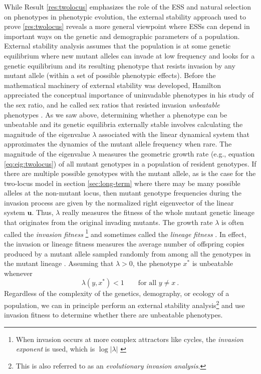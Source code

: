 \documentclass[11pt]{article}
\newcommand{\ess}[1]{#1^*}
\renewcommand{\vec}[1]{\symbf{#1}}
\newcommand{\eig}{\lambda}
\begin{document}
While Result \ref{res:twolocus} emphasizes the role of the ESS and natural selection on phenotypes in phenotypic evolution, the external stability approach used to prove \ref{res:twolocus} reveals a more general viewpoint where ESSs can depend in important ways on the genetic and demographic parameters of a population. External stability analysis assumes that the population is at some genetic equilibrium where new mutant alleles can invade at low frequency and looks for a genetic equilibrium and its resulting phenotype that resists invasion by any mutant allele (within a set of possible phenotypic effects). Before the mathematical machinery of external stability was developed, Hamilton appreciated the conceptual importance of uninvadable phenotypes in his study of the sex ratio, and he called sex ratios that resisted invasion \textit{unbeatable} phenotypes \cite{Hamilton:1967}. As we saw above, determining whether a phenotype can be unbeatable and its genetic equilibria externally stable involves calculating the magnitude of the eigenvalue $\eig$ associated with the linear dynamical system that approximates the dynamics of the mutant allele frequency when rare. The magnitude of the eigenvalue $\eig$ measures the geometric growth rate (e.g., equation \eqref{eq:eig:twolocus}) of all mutant genotypes in a population of resident genotypes. If there are multiple possible genotypes with the mutant allele, as is the case for the two-locus model in section \ref{sec:long-term} where there may be many possible alleles at the non-mutant locus, then mutant genotype frequencies during the invasion process are given by the normalized right eigenvector of the linear system $\vec{u}$. Thus, $\eig$ really measures the fitness of the whole mutant genetic lineage that originates from the original invading mutants. The growth rate $\eig$ is often called the \textit{invasion fitness} \cite{Metz:Nisbet:1992,Heino:Metz:1998}\footnote{When invasion occurs at more complex attractors like cycles, the \textit{invasion exponent} is used, which is $\log |\eig|$ \cite{Rand:Wilson:1994}} and sometimes called the \textit{lineage fitness} \cite{Lehmann:Alger:2015,Akcay:VanCleve:2016,Lehmann:Mullon:2016,Lehmann:Rousset:2020}. In effect, the invasion or lineage fitness measures the average number of offspring copies produced by a mutant allele sampled randomly from among all the genotypes in the mutant lineage \cite{Lehmann:Mullon:2016}. Assuming that $\eig >0$, the phenotype $\ess{x}$ is unbeatable whenever
\begin{equation}
  \label{eq:unbeatable}
  \eig(y, \ess{x}) < 1 \qquad \text{for all } y \ne x \: .
\end{equation}
Regardless of the complexity of the genetics, demography, or ecology of a population, we can in principle perform an external stability analysis\footnote{This is also referred to as an \textit{evolutionary invasion analysis}.} and use invasion fitness to determine whether there are unbeatable phenotypes.
\end{document}

